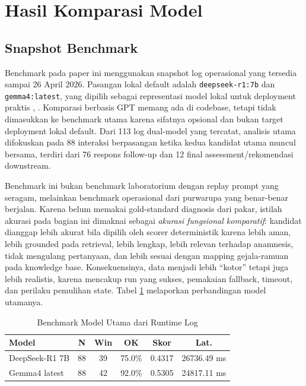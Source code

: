\documentclass[conference]{IEEEtran}
\begin{document}
\section{Hasil Komparasi Model}
\subsection{Snapshot Benchmark}
Benchmark pada paper ini menggunakan snapshot log operasional yang tersedia sampai 26 April 2026. Pasangan lokal default adalah \texttt{deepseek-r1:7b} dan \texttt{gemma4:latest}, yang dipilih sebagai representasi model lokal untuk deployment praktis \cite{b14}, \cite{b15}. Komparasi berbasis GPT memang ada di codebase, tetapi tidak dimasukkan ke benchmark utama karena sifatnya opsional dan bukan target deployment lokal default. Dari 113 log dual-model yang tercatat, analisis utama difokuskan pada 88 interaksi berpasangan ketika kedua kandidat utama muncul bersama, terdiri dari 76 respons follow-up dan 12 final assessment/rekomendasi downstream.

Benchmark ini bukan benchmark laboratorium dengan replay prompt yang seragam, melainkan benchmark operasional dari purwarupa yang benar-benar berjalan. Karena belum memakai gold-standard diagnosis dari pakar, istilah akurasi pada bagian ini dimaknai sebagai \emph{akurasi fungsional komparatif}: kandidat dianggap lebih akurat bila dipilih oleh scorer deterministik karena lebih aman, lebih grounded pada retrieval, lebih lengkap, lebih relevan terhadap anamnesis, tidak mengulang pertanyaan, dan lebih sesuai dengan mapping gejala-ramuan pada knowledge base. Konsekuensinya, data menjadi lebih ``kotor'' tetapi juga lebih realistis, karena mencakup run yang sukses, pemakaian fallback, timeout, dan perilaku pemulihan state. Tabel \ref{tab:primary_models_id} melaporkan perbandingan model utamanya.

\begin{table}[t]
\caption{Benchmark Model Utama dari Runtime Log}
\label{tab:primary_models_id}
\centering
\scriptsize
\setlength{\tabcolsep}{2pt}
\begin{tabular}{|p{1.7cm}|c|c|c|c|c|}
\hline
\textbf{Model} & \textbf{N} & \textbf{Win} & \textbf{OK} & \textbf{Skor} & \textbf{Lat.} \\
\hline
DeepSeek-R1 7B & 88 & 39 & 75.0\% & 0.4317 & 26736.49 ms \\
\hline
Gemma4 latest & 88 & 42 & 92.0\% & 0.5305 & 24817.11 ms \\
\hline
\end{tabular}
\end{table}
\end{document}
